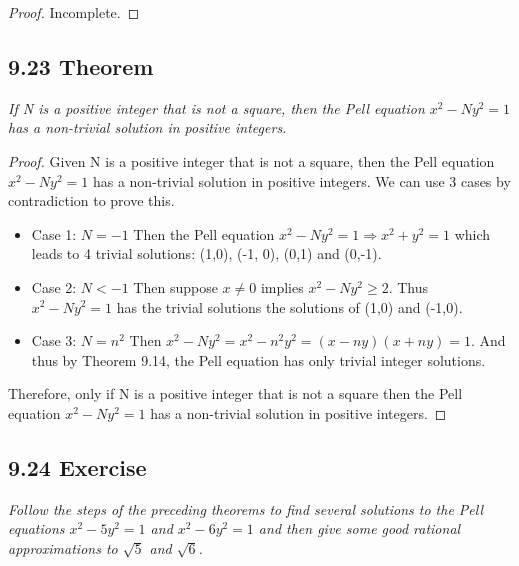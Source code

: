 \documentclass{article}
\begin{document}
\begin{proof}
Incomplete.
\end{proof}

\subsection*{9.23 Theorem} 
\quad \textit{If N is a positive integer that is not a square, then the Pell equation $x^2 - Ny^2 = 1$ has a non-trivial solution in positive integers.}

\begin{proof}
Given N is a positive integer that is not a square, then the Pell equation $x^2 - Ny^2 = 1$ has a non-trivial solution in positive integers. We can use 3 cases by contradiction to prove this.
\begin{itemize}
    \item Case 1: $N = -1$
    Then the Pell equation $x^2 - Ny^2 = 1 \Longrightarrow x^2 + y^2 = 1$ which leads to 4 trivial solutions: (1,0), (-1, 0), (0,1) and (0,-1).
    \item Case 2: $N < -1$
    Then suppose $x \neq 0$ implies $x^2 - Ny^2 \geq 2$. Thus $x^2 - Ny^2 = 1$ has the trivial solutions the solutions of (1,0) and (-1,0). 
    \item Case 3: $N = n^2$
    Then $x^2 - Ny^2 = x^2 - n^2y^2 = (x - ny)(x + ny) = 1$. And thus by Theorem 9.14, the Pell equation has only trivial integer solutions.
\end{itemize}
Therefore, only if N is a positive integer that is not a square then the Pell equation $x^2 - Ny^2 = 1$ has a non-trivial solution in positive integers.
\end{proof}

\subsection*{9.24 Exercise} 
\quad \textit{Follow the steps of the preceding theorems to find several solutions to the Pell equations $x^2 - 5y^2 = 1$ and $x^2 - 6y^2 = 1$ and then give some good rational approximations to $\sqrt{5}$ and $\sqrt{6}$.}
\end{document}
